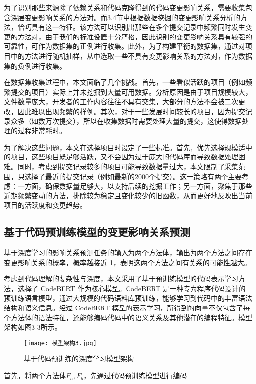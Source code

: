 为了识别那些来源除了依赖关系和代码克隆得到的代码变更影响关系，需要收集包含深层变更影响关系的方法对。而3.4节中根据数据挖掘的变更影响关系分析的方法，恰巧具有这一特征。该方法可以识别出那些在多个提交记录中频繁同时发生变更的方法对，由于我们的标准设置十分严格，因此识别的变更影响关系具有较强的可靠性，可作为数据集的正例进行收集。此外，为了构建平衡的数据集，通过对项目中的方法进行随机抽样，从中选取一些不具有变更影响关系的方法对，作为数据集的负例进行收集。

在数据集收集过程中，本文面临了几个挑战。首先，一些看似活跃的项目（例如频繁提交的项目）实际上并未挖掘到大量可用数据。分析原因是由于项目规模较大，文件数量庞大，开发者的工作内容往往不具有交集，大部分的方法不会被二次更改，因此难以出现频繁的样例。其次，对于一些发展时间较长的项目，因为提交记录众多（如数万次提交），所以在收集数据时需要处理大量的提交，这使得数据处理的过程非常耗时。

为了解决这些问题，本文在选择项目时设定了一些标准。首先，优先选择规模适中的项目，这些项目既足够活跃，又不会因为过于庞大的代码库而导致数据处理困难。同时，考虑到提交记录较多的项目可能导致数据量过大，本文限制了采集范围，只选择了最近的提交记录（例如最新的2000个提交）。这一策略有两个主要考虑：一方面，确保数据量足够大，以支持后续的挖掘工作；另一方面，聚焦于那些近期频繁变动的方法，排除较为稳定且变化较少的旧函数，从而更好地反映出当前项目的活跃度和变更趋势。

\subsection{基于代码预训练模型的变更影响关系预测}

基于深度学习的影响关系预测任务的输入为两个方法体，输出为两个方法之间存在变更影响关系的概率，概率越接近 1，表明这两个方法之间有关系的可能性越大。

考虑到代码理解的复杂性与深度，本文采用了基于预训练模型的代码表示学习方法，选择了 CodeBERT 作为核心模型。CodeBERT 是一种专为程序代码设计的预训练语言模型，通过大规模的代码语料库预训练，能够学习到代码中的丰富语法结构和语义信息。经过 CodeBERT 模型的表示学习，所得到的向量不仅包含了每个方法体的语法特征，还能够编码代码中的语义关系及其他潜在的编程特征。模型架构如图3-3所示。

\begin{figure}[h]
\centering
\texttt{[image: 模型架构3.jpg]}
\caption{基于代码预训练的深度学习模型架构}
\end{figure}


首先，将两个方法体$ F_a, F_b$，先通过代码预训练模型进行编码

